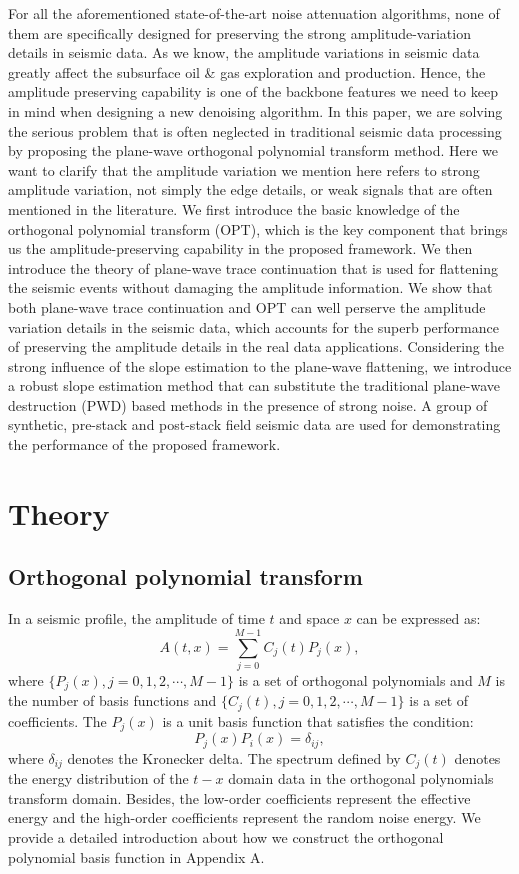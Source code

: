 For all the aforementioned state-of-the-art noise attenuation algorithms, none of them are specifically designed for preserving the strong amplitude-variation details in seismic data. As we know, the amplitude variations in seismic data greatly affect the subsurface oil \& gas exploration and production. Hence, the amplitude preserving capability is one of the backbone features we need to keep in mind when designing a new denoising algorithm. In this paper, we are solving the serious problem that is often neglected in traditional seismic data processing by proposing the plane-wave orthogonal polynomial transform method. Here we want to clarify that the amplitude variation we mention here refers to strong amplitude variation, not simply the edge details, or weak signals that are often mentioned in the literature. We first introduce the basic knowledge of the orthogonal polynomial transform (OPT), which is the key component that brings us the amplitude-preserving capability in the proposed framework. We then introduce the theory of plane-wave trace continuation that is used for flattening the seismic events without damaging the amplitude information. We show that both plane-wave trace continuation and OPT can well perserve the amplitude variation details in the seismic data, which accounts for the superb performance of preserving the amplitude details in the real data applications. Considering the strong influence of the slope estimation to the plane-wave flattening, we introduce a robust slope estimation method that can substitute the traditional plane-wave destruction (PWD) \cite[]{fomel2002pwd} based methods in the presence of strong noise. A group of synthetic, pre-stack and post-stack field seismic data are used for demonstrating the performance of the proposed framework. 

\section{Theory}
\subsection{Orthogonal polynomial transform}
In a seismic profile, the amplitude of time $t$ and space $x$ can be expressed as:
\begin{equation}
\label{eq:ampli}
A(t,x) = \sum_{j=0}^{M-1} C_j(t) P_j(x),
\end{equation}
where $\{P_j(x),j=0,1,2,\cdots,M-1 \}$ is a set of orthogonal polynomials and $M$ is the number of basis functions and $\{C_j(t),j=0,1,2,\cdots,M-1 \}$ is a set of coefficients. The $P_j(x)$ is a unit basis function that satisfies the condition:
\begin{equation}
\label{eq:con}
P_j(x)P_i(x)=\delta_{ij},
\end{equation}
where $\delta_{ij}$ denotes the Kronecker delta. The spectrum defined by $C_j(t)$ denotes the energy distribution of the $t-x$ domain data in the orthogonal polynomials transform domain. Besides, the low-order coefficients represent the effective energy and the high-order coefficients represent the random noise energy. We provide a detailed introduction about how we construct the orthogonal polynomial basis function in Appendix A. 

